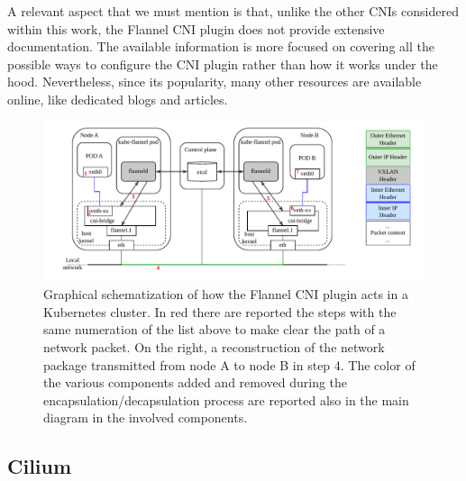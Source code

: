 
A relevant aspect that we must mention is that, unlike the other CNIs considered
within this work, the Flannel CNI plugin does not provide extensive
documentation. The available information is more focused on covering all the
possible ways to configure the CNI plugin rather than how it works under the
hood. Nevertheless, since its popularity, many other resources are available
online, like dedicated blogs and articles.


\begin{figure}
  \centering
  \includegraphics[width=\textwidth]{img/chpt2/CNI-flannel}
  \caption{Graphical schematization of how the Flannel CNI plugin acts in a
    Kubernetes cluster. In red there are reported the steps with the same
    numeration of the list above to make clear the path of a network packet.
    On the right, a reconstruction of the network package transmitted from node
    A to node B in step 4. The color of the various components added and removed
    during the encapsulation/decapsulation process are reported also in the main
    diagram in the involved components.
  }
  \label{fig:cni-flannel}
\end{figure}

\subsection{Cilium}\label{subsec:cilium}

